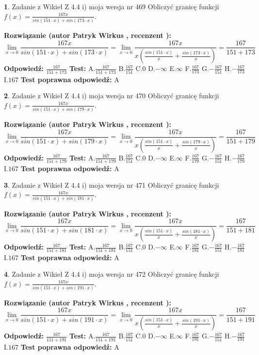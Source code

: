 \documentclass[12pt, a4paper]{article}
\theoremstyle{definition} %
\newtheorem{zad}{}
\newcommand{\zadStart}[1]{\begin{zad}#1\newline}
\newcommand{\zadStop}{\end{zad}}
\newcommand{\rozwStart}[2]{\noindent \textbf{Rozwiązanie (autor #1 , recenzent #2): }\newline}
\newcommand{\rozwStop}{\newline}
\newcommand{\odpStart}{\noindent \textbf{Odpowiedź:}\newline}
\newcommand{\odpStop}{\newline}
\newcommand{\testStart}{\noindent \textbf{Test:}\newline}
\newcommand{\testStop}{\newline}
\newcommand{\kluczStart}{\noindent \textbf{Test poprawna odpowiedź:}\newline}
\newcommand{\kluczStop}{\newline}
\begin{document}
\zadStart{Zadanie z Wikieł Z 4.4 i) moja wersja nr 469}
Obliczyć granicę funkcji $f(x)=\frac{167x}{sin(151\cdot x) +sin(173\cdot x)}$.
\zadStop
\rozwStart{Patryk Wirkus}{}
$$\lim\limits_{x\to 0}\frac{167x}{sin(151\cdot x) +sin(173\cdot x)}=\lim\limits_{x\to 0}\frac{167x}{x(\frac{sin(151\cdot x)}{x}+\frac{sin(173\cdot x)}{x})}=\frac{167}{151+173}$$
\rozwStop
\odpStart
$\frac{167}{151+173}$
\odpStop
\testStart
A.$\frac{167}{151+173}$
B.$\frac{167}{151}$
C.$0$
D.$-\infty$
E.$\infty$
F.$\frac{167}{173}$
G.$-\frac{167}{151}$
H.$-\frac{167}{173}$
I.$167$
\testStop
\kluczStart
A
\kluczStop



\zadStart{Zadanie z Wikieł Z 4.4 i) moja wersja nr 470}
Obliczyć granicę funkcji $f(x)=\frac{167x}{sin(151\cdot x) +sin(179\cdot x)}$.
\zadStop
\rozwStart{Patryk Wirkus}{}
$$\lim\limits_{x\to 0}\frac{167x}{sin(151\cdot x) +sin(179\cdot x)}=\lim\limits_{x\to 0}\frac{167x}{x(\frac{sin(151\cdot x)}{x}+\frac{sin(179\cdot x)}{x})}=\frac{167}{151+179}$$
\rozwStop
\odpStart
$\frac{167}{151+179}$
\odpStop
\testStart
A.$\frac{167}{151+179}$
B.$\frac{167}{151}$
C.$0$
D.$-\infty$
E.$\infty$
F.$\frac{167}{179}$
G.$-\frac{167}{151}$
H.$-\frac{167}{179}$
I.$167$
\testStop
\kluczStart
A
\kluczStop



\zadStart{Zadanie z Wikieł Z 4.4 i) moja wersja nr 471}
Obliczyć granicę funkcji $f(x)=\frac{167x}{sin(151\cdot x) +sin(181\cdot x)}$.
\zadStop
\rozwStart{Patryk Wirkus}{}
$$\lim\limits_{x\to 0}\frac{167x}{sin(151\cdot x) +sin(181\cdot x)}=\lim\limits_{x\to 0}\frac{167x}{x(\frac{sin(151\cdot x)}{x}+\frac{sin(181\cdot x)}{x})}=\frac{167}{151+181}$$
\rozwStop
\odpStart
$\frac{167}{151+181}$
\odpStop
\testStart
A.$\frac{167}{151+181}$
B.$\frac{167}{151}$
C.$0$
D.$-\infty$
E.$\infty$
F.$\frac{167}{181}$
G.$-\frac{167}{151}$
H.$-\frac{167}{181}$
I.$167$
\testStop
\kluczStart
A
\kluczStop



\zadStart{Zadanie z Wikieł Z 4.4 i) moja wersja nr 472}
Obliczyć granicę funkcji $f(x)=\frac{167x}{sin(151\cdot x) +sin(191\cdot x)}$.
\zadStop
\rozwStart{Patryk Wirkus}{}
$$\lim\limits_{x\to 0}\frac{167x}{sin(151\cdot x) +sin(191\cdot x)}=\lim\limits_{x\to 0}\frac{167x}{x(\frac{sin(151\cdot x)}{x}+\frac{sin(191\cdot x)}{x})}=\frac{167}{151+191}$$
\rozwStop
\odpStart
$\frac{167}{151+191}$
\odpStop
\testStart
A.$\frac{167}{151+191}$
B.$\frac{167}{151}$
C.$0$
D.$-\infty$
E.$\infty$
F.$\frac{167}{191}$
G.$-\frac{167}{151}$
H.$-\frac{167}{191}$
I.$167$
\testStop
\kluczStart
A
\kluczStop
\end{document}
